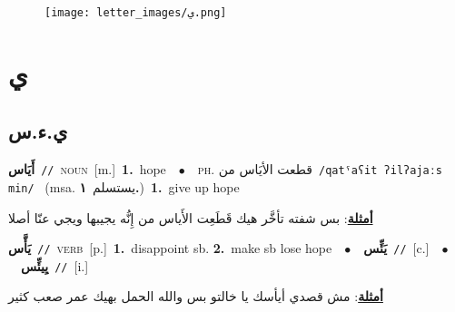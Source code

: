 \documentclass[10pt,a4paper,twoside]{article} %
\begin{document}
\begin{figure*}[t!]\centering\texttt{[image: letter\_images/ي.png]}\end{figure*}
\color{white}

 \section*{\foreignlanguage{arabic}{ي}} 
 \begin{multicols}{2} 

%
\color{black}
\vspace{-3mm}
\subsection*{\color{blue}\foreignlanguage{arabic}{ي.ء.س}\color{blue}{}} 

{\setlength\topsep{0pt}\textbf{\foreignlanguage{arabic}{أَيَاس}}\ {\color{gray}\texttt{//}\color{black}}\ \textsc{noun}\ [m.]\ \textbf{1.}~hope\ \ $\bullet$\ \ \textsc{ph.} \color{gray} \foreignlanguage{arabic}{قطعت الأيَاس من}\color{black}\ {\color{gray}\texttt{/{\sffamily qatˤaʕit ʔilʔajaːs min}/}\color{black}}\ \color{gray} (msa. \foreignlanguage{arabic}{يستسلم}~\foreignlanguage{arabic}{\textbf{١.}})\color{black}\ \textbf{1.}~give up hope\  \begin{flushright}\color{gray}\foreignlanguage{arabic}{\textbf{\underline{\foreignlanguage{arabic}{أمثلة}}}: بس شفته تأخَّر هيك قَطَعِت الأَياس من إِنُّه يجيبها ويجي عنّا أصلا}\end{flushright}\color{black}} \vspace{2mm}

{\setlength\topsep{0pt}\textbf{\foreignlanguage{arabic}{يَأَّس}}\ {\color{gray}\texttt{//}\color{black}}\ \textsc{verb}\ [p.]\ \textbf{1.}~disappoint sb.  \textbf{2.}~make sb lose hope\ \ $\bullet$\ \ \setlength\topsep{0pt}\textbf{\foreignlanguage{arabic}{يَئِّس}}\ {\color{gray}\texttt{//}\color{black}}\ [c.]\ \ $\bullet$\ \ \setlength\topsep{0pt}\textbf{\foreignlanguage{arabic}{يِيئِّس}}\ {\color{gray}\texttt{//}\color{black}}\ [i.]\  \begin{flushright}\color{gray}\foreignlanguage{arabic}{\textbf{\underline{\foreignlanguage{arabic}{أمثلة}}}: مش قصدي أيأسك يا خالتو بس والله الحمل بهيك عمر صعب كثير}\end{flushright}\color{black}} \vspace{2mm}


\end{multicols}
\end{document}
